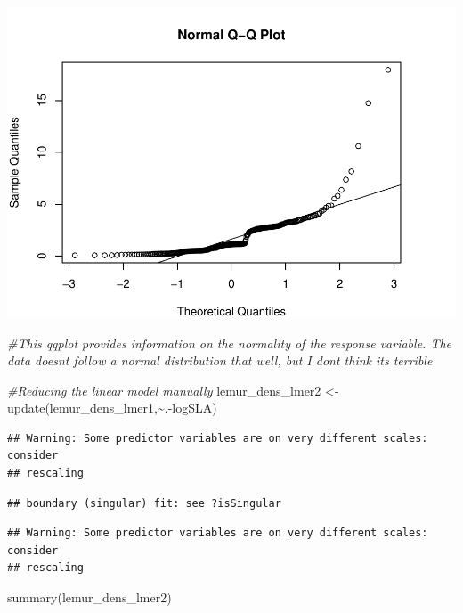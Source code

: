 \documentclass[
  12pt,
]{article}
\newenvironment{Shaded}{\begin{snugshade}}{\end{snugshade}}
\newcommand{\CommentTok}[1]{\textcolor[rgb]{0.56,0.35,0.01}{\textit{#1}}}
\newcommand{\FunctionTok}[1]{\textcolor[rgb]{0.00,0.00,0.00}{#1}}
\newcommand{\NormalTok}[1]{#1}
\newcommand{\OtherTok}[1]{\textcolor[rgb]{0.56,0.35,0.01}{#1}}
\newcommand{\SpecialCharTok}[1]{\textcolor[rgb]{0.00,0.00,0.00}{#1}}
\begin{document}
\includegraphics{project_draft_files/figure-latex/unnamed-chunk-5-5.pdf}

\begin{Shaded}
\begin{Highlighting}[]
\CommentTok{\#This qqplot provides information on the normality of the response variable. The data doesn\textquotesingle{}t follow a normal distribution that well, but I don\textquotesingle{}t think its terrible}


\CommentTok{\#Reducing the linear model manually}
\NormalTok{lemur\_dens\_lmer2 }\OtherTok{\textless{}{-}} \FunctionTok{update}\NormalTok{(lemur\_dens\_lmer1,}\SpecialCharTok{\textasciitilde{}}\NormalTok{.}\SpecialCharTok{{-}}\NormalTok{logSLA)}
\end{Highlighting}
\end{Shaded}

\begin{verbatim}
## Warning: Some predictor variables are on very different scales: consider
## rescaling
\end{verbatim}

\begin{verbatim}
## boundary (singular) fit: see ?isSingular
\end{verbatim}

\begin{verbatim}
## Warning: Some predictor variables are on very different scales: consider
## rescaling
\end{verbatim}

\begin{Shaded}
\begin{Highlighting}[]
\FunctionTok{summary}\NormalTok{(lemur\_dens\_lmer2)}
\end{Highlighting}
\end{Shaded}
\end{document}
